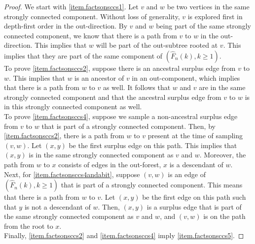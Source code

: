 \begin{proof}
We start with \ref{item.factsonsccs1}. Let $v$ and $w$ be two vertices in the same strongly connected component. Without loss of generality, $v$ is explored first in depth-first order in the out-direction. By $v$ and $w$ being part of the same strongly connected component, we know that there is a path from $v$ to $w$ in the out-direction. This implies that $w$ will be part of the out-subtree rooted at $v$. This implies that they are part of the same component of $(\hat{F}_n(k),k\geq 1)$. \\
To prove \ref{item.factsonsccs2}, suppose there is an ancestral surplus edge from $v$ to $w$. This implies that $w$ is an ancestor of $v$ in an out-component, which implies that there is a path from $w$ to $v$ as well. It follows that $w$ and $v$ are in the same strongly connected component and that the ancestral surplus edge from $v$ to $w$ is in this strongly connected component as well. \\
To prove \ref{item.factsonsccs4}, suppose we sample a non-ancestral surplus edge from $v$ to $w$ that is part of a strongly connected component. Then, by \ref{item.factsonsccs2}, there is a path from $w$ to $v$ present at the time of sampling $(v,w)$. Let $(x,y)$ be the first surplus edge on this path. This implies that $(x,y)$ is in the same strongly connected component as $v$ and $w$. Moreover, the path from $w$ to $x$ consists of edges in the out-forest, $x$ is a descendant of $w$.\\
Next, for \ref{item.factsonsccs4andabit}, suppose $(v,w)$ is an edge of $(\hat{F}_n(k),k\geq 1)$ that is part of a strongly connected component. This means that there is a path from $w$ to $v$. Let $(x,y)$ be the first edge on this path such that $y$ is not a descendant of $w$. Then, $(x,y)$ is a surplus edge that is part of the same strongly connected component as $v$ and $w$, and $(v,w)$ is on the path from the root to $x$. \\
Finally, \ref{item.factsonsccs2} and \ref{item.factsonsccs4} imply \ref{item.factsonsccs5}. 
\end{proof}

